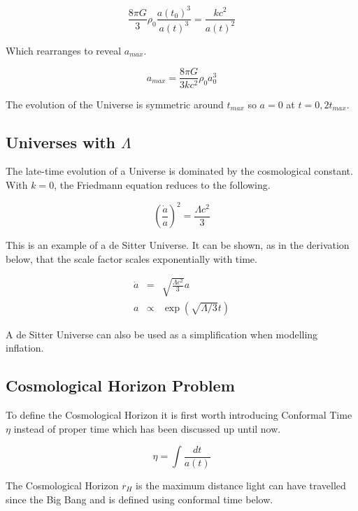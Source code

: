\documentclass[12pt]{article} %
\begin{document}
\begin{equation}
\frac{8\pi G}{3}\rho_{0}\frac{a(t_{0})^3}{a(t)^3} =\frac{kc^2}{a(t)^2}
\end{equation}

Which rearranges to reveal $a_{max}$.

\begin{equation}
a_{max} = \frac{8\pi G}{3kc^2}\rho_{0}a_{0}^3
\end{equation}

The evolution of the Universe is symmetric around $t_{max}$ so $a=0$ at $t=0, 2t_{max}$.

\subsection{Universes with $\Lambda$}

The late-time evolution of a Universe is dominated by the cosmological constant. With $k=0$, the Friedmann equation reduces to the following\cite{modcosmo}.

\begin{equation}
\left(\frac{\dot a}{a}\right)^2 = \frac{\Lambda c^2}{3}
\end{equation}

This is an example of a de Sitter Universe. It can be shown, as in the derivation below, that the scale factor scales exponentially with time.

\begin{eqnarray*}
\dot a &=& \sqrt{\frac{\Lambda c^2}{3}}a
\\ a &\propto& \exp \left(\sqrt{\Lambda /3} t\right)
\end{eqnarray*}

A de Sitter Universe can also be used as a simplification when modelling inflation.

\subsection{Cosmological Horizon Problem}

To define the Cosmological Horizon it is first worth introducing Conformal Time $\eta$ instead of proper time which has been discussed up until now.

\begin{equation}
\eta = \int \frac{dt}{a(t)}
\end{equation}

The Cosmological Horizon $r_{H}$ is the maximum distance light can have travelled since the Big Bang and is defined using conformal time below.
\end{document}
